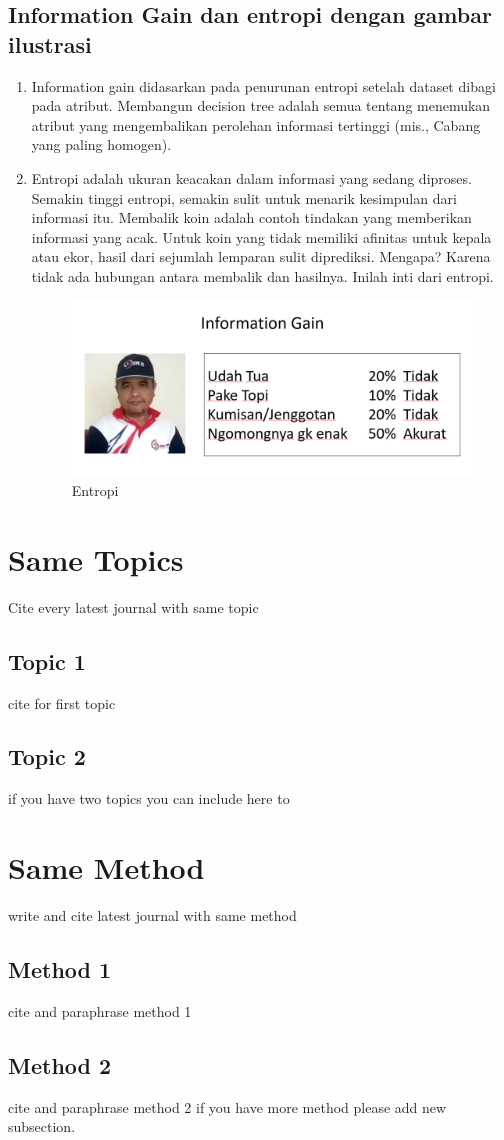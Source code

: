 \subsection{Information Gain dan entropi dengan gambar ilustrasi}
\begin{enumerate}
\item Information gain didasarkan pada penurunan entropi setelah dataset dibagi pada atribut. Membangun decision tree adalah semua tentang menemukan atribut yang mengembalikan perolehan informasi tertinggi (mis., Cabang yang paling homogen).
\item Entropi adalah ukuran keacakan dalam informasi yang sedang diproses. Semakin tinggi entropi, semakin sulit untuk menarik kesimpulan dari informasi itu. Membalik koin adalah contoh tindakan yang memberikan informasi yang acak. Untuk koin yang tidak memiliki afinitas untuk kepala atau ekor, hasil dari sejumlah lemparan sulit diprediksi. Mengapa? Karena tidak ada hubungan antara membalik dan hasilnya. Inilah inti dari entropi.
\begin{figure}[ht]
\centering
\includegraphics[scale=0.5]{figures/andi/no7.PNG}
\caption{Entropi}
\label{contoh}
\end{figure}
\end{enumerate}


\section{Same Topics}
Cite every latest journal with same topic
\subsection{Topic 1}
cite for first topic

\subsection{Topic 2}
if you have two topics you can include here to


\section{Same Method}
write and cite latest journal with same method

\subsection{Method 1}
cite and paraphrase method 1

\subsection{Method 2}
cite and paraphrase method 2 if you have more method please add new subsection.




 